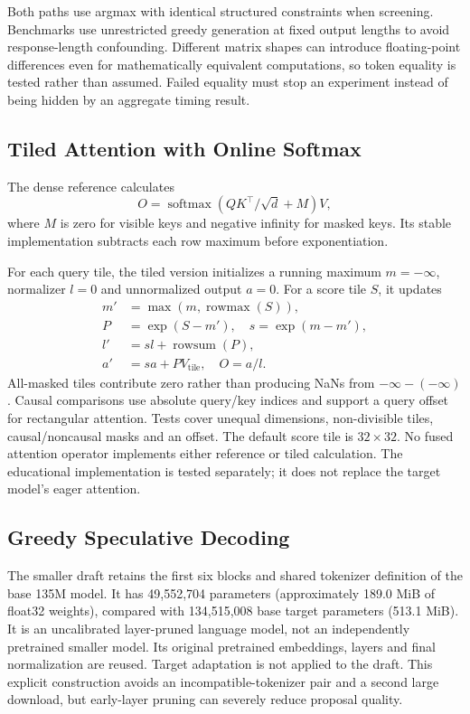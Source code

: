 \documentclass[conference]{IEEEtran}
\begin{document}
Both paths use argmax with identical structured constraints when screening. Benchmarks use unrestricted greedy generation at fixed output lengths to avoid response-length confounding. Different matrix shapes can introduce floating-point differences even for mathematically equivalent computations, so token equality is tested rather than assumed. Failed equality must stop an experiment instead of being hidden by an aggregate timing result.

\subsection{Tiled Attention with Online Softmax}
The dense reference calculates
\begin{equation} O = \operatorname{softmax}(QK^\top/\sqrt{d}+M)V, \end{equation}
where $M$ is zero for visible keys and negative infinity for masked keys. Its stable implementation subtracts each row maximum before exponentiation.

For each query tile, the tiled version initializes a running maximum $m=-\infty$, normalizer $l=0$ and unnormalized output $a=0$. For a score tile $S$, it updates
\begin{align}
m'&=\max(m,\operatorname{rowmax}(S)),\\
P&=\exp(S-m'),\quad s=\exp(m-m'),\\
l'&=s l+\operatorname{rowsum}(P),\\
a'&=s a+PV_{\mathrm{tile}},\quad O=a/l.
\end{align}
All-masked tiles contribute zero rather than producing NaNs from $-\infty-(-\infty)$. Causal comparisons use absolute query/key indices and support a query offset for rectangular attention. Tests cover unequal dimensions, non-divisible tiles, causal/noncausal masks and an offset. The default score tile is $32\times32$. No fused attention operator implements either reference or tiled calculation. The educational implementation is tested separately; it does not replace the target model's eager attention.

\subsection{Greedy Speculative Decoding}
The smaller draft retains the first six blocks and shared tokenizer definition of the base 135M model. It has 49,552,704 parameters (approximately 189.0 MiB of float32 weights), compared with 134,515,008 base target parameters (513.1 MiB). It is an uncalibrated layer-pruned language model, not an independently pretrained smaller model. Its original pretrained embeddings, layers and final normalization are reused. Target adaptation is not applied to the draft. This explicit construction avoids an incompatible-tokenizer pair and a second large download, but early-layer pruning can severely reduce proposal quality.
\end{document}
